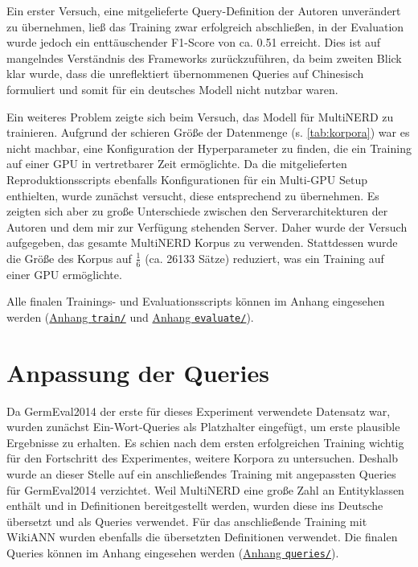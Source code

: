 Ein erster Versuch, eine mitgelieferte Query-Definition der Autoren unverändert zu übernehmen, ließ das Training zwar erfolgreich abschließen, in der Evaluation wurde jedoch ein enttäuschender F1-Score von ca. 0.51 erreicht. Dies ist auf mangelndes Verständnis des Frameworks zurückzuführen, da beim zweiten Blick klar wurde, dass die unreflektiert übernommenen Queries auf Chinesisch formuliert und somit für ein deutsches Modell nicht nutzbar waren.

Ein weiteres Problem zeigte sich beim Versuch, das Modell für MultiNERD zu trainieren. Aufgrund der schieren Größe der Datenmenge (s. \autoref{tab:korpora}) war es nicht machbar, eine Konfiguration der Hyperparameter zu finden, die ein Training auf einer GPU in vertretbarer Zeit ermöglichte. Da die mitgelieferten Reproduktionsscripts ebenfalls Konfigurationen für ein Multi-GPU Setup enthielten, wurde zunächst versucht, diese entsprechend zu übernehmen. Es zeigten sich aber zu große Unterschiede zwischen den Serverarchitekturen der Autoren und dem mir zur Verfügung stehenden Server. Daher wurde der Versuch aufgegeben, das gesamte MultiNERD Korpus zu verwenden. Stattdessen wurde die Größe des Korpus auf \(\frac{1}{6}\) (ca. 26133 Sätze) reduziert, was ein Training auf einer GPU ermöglichte.

Alle finalen Trainings- und Evaluationsscripts können im Anhang eingesehen werden (\hyperref[app:train]{Anhang \texttt{train/}} und \hyperref[app:evaluate]{Anhang \texttt{evaluate/}}).


\section{Anpassung der Queries}
\label{ch:Training:sec:Anpassung_Queries}


Da GermEval2014 der erste für dieses Experiment verwendete Datensatz war, wurden zunächst Ein-Wort-Queries als Platzhalter eingefügt, um erste plausible Ergebnisse zu erhalten. Es schien nach dem ersten erfolgreichen Training wichtig für den Fortschritt des Experimentes, weitere Korpora zu untersuchen. Deshalb wurde an dieser Stelle auf ein anschließendes Training mit angepassten Queries für \mbox{GermEval2014} verzichtet. Weil MultiNERD eine große Zahl an Entityklassen enthält und in \textcite{multinerd} Definitionen bereitgestellt werden, wurden diese ins Deutsche übersetzt und als Queries verwendet. Für das anschließende Training mit WikiANN wurden ebenfalls die übersetzten Definitionen verwendet. Die finalen Queries können im Anhang eingesehen werden (\hyperref[app:queries]{Anhang \texttt{queries/}}).

